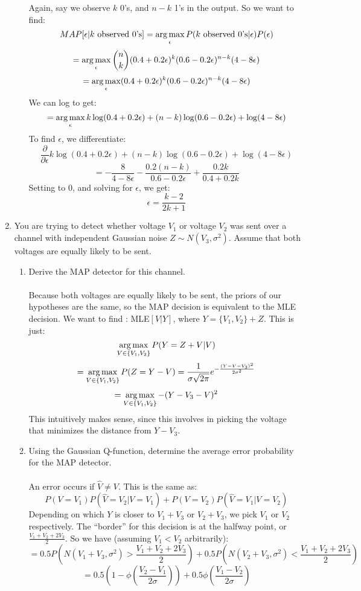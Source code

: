 \begin{enumerate}
\begin{enumerate}
        Again, say we observe $k$ 0's, and $n-k$ 1's in the output. So we want to find:
        $$MAP[\epsilon | k \text{ observed 0's}] = \operatorname*{arg\,max}_{\epsilon} P(k \text{ observed 0's} | \epsilon) P(\epsilon)$$
        $$=\operatorname*{arg\,max}_{\epsilon} \binom{n}{k} (0.4 + 0.2 \epsilon)^k (0.6 - 0.2 \epsilon)^{n-k} (4 - 8 \epsilon)$$
        $$=\operatorname*{arg\,max}_{\epsilon} (0.4 + 0.2 \epsilon)^k (0.6 - 0.2 \epsilon)^{n-k} (4 - 8 \epsilon)$$
        We can log to get:
        $$=\operatorname*{arg\,max}_{\epsilon} k \log(0.4 + 0.2 \epsilon) + (n-k) \log(0.6 - 0.2 \epsilon) + \log(4 - 8 \epsilon)$$
        To find $\epsilon$, we differentiate:
        $$\frac{\partial}{\partial \epsilon} k \log(0.4 + 0.2 \epsilon) + (n-k) \log(0.6 - 0.2 \epsilon) + \log(4 - 8 \epsilon)$$
        $$=-\frac{8}{4 - 8 \epsilon} - \frac{0.2(n-k)}{0.6 - 0.2 \epsilon} + \frac{0.2k}{0.4 + 0.2k}$$
        Setting to $0$, and solving for $\epsilon$, we get:
        $$\epsilon = \frac{k-2}{2k + 1}$$
    \end{enumerate}
  \item You are trying to detect whether voltage $V_1$ or voltage $V_2$ was sent over a channel with independent Gaussian noise $Z \sim N(V_3, \sigma^2)$. Assume that both voltages are equally likely to be sent.
    \begin{enumerate}
      \item Derive the MAP detector for this channel.\\\\

        Because both voltages are equally likely to be sent, the priors of our hypotheses are the same, so the MAP decision is equivalent to the MLE decision. We want to find : MLE$[V | Y]$, where $Y = \{V_1,V_2\} + Z$. This is just:
        $$\operatorname*{arg\,max}_{V \in \{V_1,V_2\}} P(Y=Z+V | V)$$
        $$=\operatorname*{arg\,max}_{V \in \{V_1,V_2\}} P(Z = Y-V) = \frac{1}{\sigma \sqrt{2 \pi}} e^{- \frac{(Y-V-V_3)^2}{2 \sigma^2}}$$
        $$=\operatorname*{arg\,max}_{V \in \{V_1,V_2\}} -(Y-V_3-V)^2$$
        This intuitively makes sense, since this involves in picking the voltage that minimizes the distance from $Y-V_3$.

      \item Using the Gaussian Q-function, determine the average error probability for the MAP detector.\\\\

        An error occurs if $\hat{V} \neq V$. This is the same as:
        $$P(V = V_1)P(\hat{V} = V_2 | V = V_1) + P(V = V_2)P(\hat{V} = V_1 | V = V_2)$$
        Depending on which $Y$ is closer to $V_1+V_3$ or $V_2+V_3$, we pick $V_1$ or $V_2$ respectively. The ``border'' for this decision is at the halfway point, or $\frac{V_1+V_2+2V_3}{2}$. So we have (assuming $V_1 < V_2$ arbitrarily):
        $$=0.5P(N(V_1+V_3, \sigma^2) > \frac{V_1+V_2+2V_3}{2}) + 0.5P(N(V_2+V_3, \sigma^2) < \frac{V_1+V_2+2V_3}{2})$$
        $$=0.5(1 - \phi(\frac{V_2-V_1}{2 \sigma})) + 0.5 \phi(\frac{V_1-V_2}{2 \sigma})$$


\end{enumerate}
\end{enumerate}
